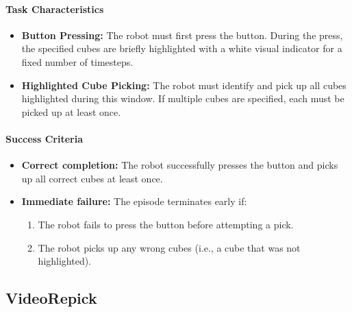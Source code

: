 \paragraph{Task Characteristics}
\begin{itemize}[itemsep=1pt, topsep=0pt, leftmargin=*]
    \item \textbf{Button Pressing:} The robot must first press the button. During the press, the specified cubes are briefly highlighted with a white visual indicator for a fixed number of timesteps.
    
    \item \textbf{Highlighted Cube Picking:} The robot must identify and pick up all cubes highlighted during this window. If multiple cubes are specified, each must be picked up at least once.
\end{itemize}

\paragraph{Success Criteria}
\begin{itemize}[itemsep=1pt, topsep=0pt, leftmargin=*]
    \item \textbf{Correct completion:} The robot successfully presses the button  and picks up all correct cubes at least once.
\item \textbf{Immediate failure:} The episode terminates early if:
    \begin{enumerate}[itemsep=1pt, topsep=0pt, leftmargin=*]
        \item The robot fails to press the button before attempting a pick.
        \item The robot picks up any wrong cubes (i.e., a cube that was not highlighted).
    \end{enumerate}
\end{itemize}
\clearpage




\subsection{VideoRepick}
\label{sec:task_videorepick}

